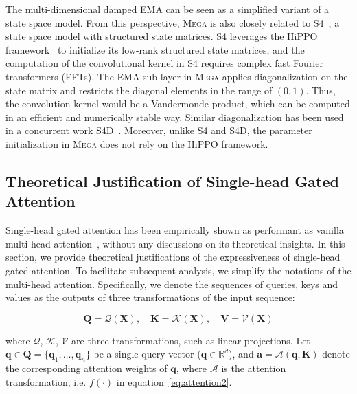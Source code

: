 The multi-dimensional damped EMA can be seen as a simplified variant of a state space model. From this perspective, \textsc{Mega} is also closely related to S4~\citep{gu2022efficiently}, a state space model with structured state matrices. S4 leverages the HiPPO framework~\citep{gu2020hippo} to initialize its low-rank structured state matrices, and the computation of the convolutional kernel in S4 requires complex fast Fourier transformers (FFTs). The EMA sub-layer in \textsc{Mega} applies diagonalization on the state matrix and restricts the diagonal elements in the range of $(0, 1)$. Thus, the convolution kernel would be a Vandermonde product, which can be computed in an efficient and numerically stable way. Similar diagonalization has been used in a concurrent work S4D~\citep{gu2022parameterization}. Moreover, unlike S4 and S4D, the parameter initialization in \textsc{Mega} does not rely on the HiPPO framework.

\subsection{Theoretical Justification of Single-head Gated Attention}
\label{subsec:theory}
Single-head gated attention has been empirically shown as performant as vanilla multi-head attention~\cite{liu2021pay,hua2022transformer}, without any discussions on its theoretical insights. In this section, we provide theoretical justifications of the expressiveness of single-head gated attention. To facilitate subsequent analysis, we simplify the notations of the multi-head attention. Specifically, we denote the sequences of queries, keys and values as the outputs of three transformations of the input sequence:

\begin{equation}
\boldsymbol{Q} = \mathcal{Q}(\boldsymbol{X}), \quad \boldsymbol{K} = \mathcal{K}(\boldsymbol{X}), \quad \boldsymbol{V} = \mathcal{V}(\boldsymbol{X})
\end{equation}

where $\mathcal{Q}$, $\mathcal{K}$, $\mathcal{V}$ are three transformations, such as linear projections. Let $\boldsymbol{q} \in \boldsymbol{Q} = \{\boldsymbol{q}_1,\ldots, \boldsymbol{q}_n \}$ be a single query vector ($\boldsymbol{q} \in \mathbb{R}^d$), and $\boldsymbol{a} = \mathcal{A}(\boldsymbol{q}, \boldsymbol{K})$ denote the corresponding attention weights of $\boldsymbol{q}$, where $\mathcal{A}$ is the attention transformation, i.e. $f(\cdot)$ in equation~\ref{eq:attention2}.

